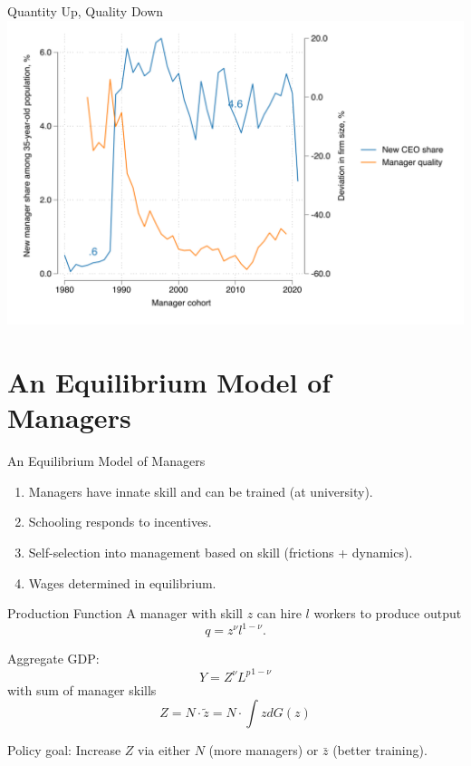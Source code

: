 \documentclass[
  ignorenonframetext,
  aspectratio=1610,
]{beamer}
\providecommand{\tightlist}{%
  \setlength{\itemsep}{0pt}\setlength{\parskip}{0pt}}
\let\oldsection\section
\renewcommand{\section}{
  \addtocounter{framenumber}{-1} %
  \oldsection
}
\begin{document}
\begin{frame}{Quantity Up, Quality Down}
\protect\hypertarget{quantity-up-quality-down}{}
\includegraphics{fig/ceo-flow-with-FE.png}
\end{frame}

\section{An Equilibrium Model of
Managers}\label{an-equilibrium-model-of-managers}

\begin{frame}{An Equilibrium Model of Managers}
\protect\hypertarget{an-equilibrium-model-of-managers-1}{}
\begin{enumerate}
\tightlist
\item
  Managers have innate skill and can be trained (at university).
\item
  Schooling responds to incentives.
\item
  Self-selection into management based on skill (frictions + dynamics).
\item
  Wages determined in equilibrium.
\end{enumerate}
\end{frame}

\begin{frame}{Production Function}
\protect\hypertarget{production-function}{}
A manager with skill \(z\) can hire \(l\) workers to produce output
\[q = z^\nu l^{1-\nu}.\]

\pause

Aggregate GDP: \[Y = Z^\nu {L^{p}}^{1-\nu}\] with sum of manager skills
\[Z = N\cdot \tilde z = N\cdot\int\! z dG(z)\]

\pause

Policy goal: Increase \(Z\) via either \(N\) (more managers) or
\(\bar z\) (better training).
\end{frame}
\end{document}
